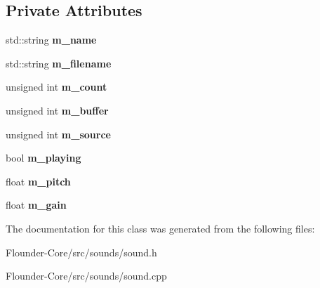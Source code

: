\subsection*{Private Attributes}
\begin{DoxyCompactItemize}
\item 
\mbox{\label{classflounder_1_1sound_a0910ea3992cd9fbcc3faf9d6d9be9579}} 
std\+::string {\bfseries m\+\_\+name}
\item 
\mbox{\label{classflounder_1_1sound_a9c1684c8431a14338f6ac089d3c748a4}} 
std\+::string {\bfseries m\+\_\+filename}
\item 
\mbox{\label{classflounder_1_1sound_af63bf8ba97a2af92004297ba3d0ad26b}} 
unsigned int {\bfseries m\+\_\+count}
\item 
\mbox{\label{classflounder_1_1sound_a8d9fabbf81cd6392d75a233c15a73946}} 
unsigned int {\bfseries m\+\_\+buffer}
\item 
\mbox{\label{classflounder_1_1sound_ac9e57d7c2a178a6b692a0881167e4c60}} 
unsigned int {\bfseries m\+\_\+source}
\item 
\mbox{\label{classflounder_1_1sound_a3516d6ab87cf5be948088fc1a59ff22c}} 
bool {\bfseries m\+\_\+playing}
\item 
\mbox{\label{classflounder_1_1sound_a4b2d4840aedd5e2c9b0e003dc1448de6}} 
float {\bfseries m\+\_\+pitch}
\item 
\mbox{\label{classflounder_1_1sound_a944bd6e5342c4b7885a324581ce81a74}} 
float {\bfseries m\+\_\+gain}
\end{DoxyCompactItemize}


The documentation for this class was generated from the following files\+:\begin{DoxyCompactItemize}
\item 
Flounder-\/\+Core/src/sounds/sound.\+h\item 
Flounder-\/\+Core/src/sounds/sound.\+cpp\end{DoxyCompactItemize}
